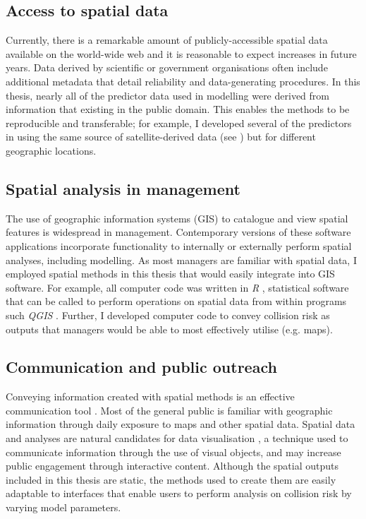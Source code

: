 \subsection{Access to spatial data}

Currently, there is a remarkable amount of publicly-accessible spatial data available on the world-wide web \citep{ma15} and it is reasonable to expect increases in future years. Data derived by scientific or government organisations often include additional metadata that detail reliability and data-generating procedures. In this thesis, nearly all of the predictor data used in modelling were derived from information that existing in the public domain. This enables the methods to be reproducible and transferable; for example, I developed several of the predictors in  using the same source of satellite-derived data (see ) but for different geographic locations.

\subsection{Spatial analysis in management}

The use of geographic information systems (GIS) to catalogue and view spatial features is widespread in management. Contemporary versions of these software applications incorporate functionality to internally or externally perform spatial analyses, including modelling. As most managers are familiar with spatial data, I employed spatial methods in this thesis that would easily integrate into GIS software. For example, all computer code was written in \textit{R} \citep{rdct16}, statistical software that can be called to perform operations on spatial data from within programs such \textit{QGIS} \citep{qgis09}. Further, I developed computer code to convey collision risk as outputs that managers would be able to most effectively utilise (e.g. maps).

\subsection{Communication and public outreach}

Conveying information created with spatial methods is an effective communication tool \citep{king00}. Most of the general public is familiar with geographic information through daily exposure to maps and other spatial data. Spatial data and analyses are natural candidates for data visualisation \citep{osul14}, a technique used to communicate information through the use of visual objects, and may increase public engagement through interactive content. Although the spatial outputs included in this thesis are static, the methods used to create them are easily adaptable to interfaces that enable users to perform analysis on collision risk by varying model parameters.


